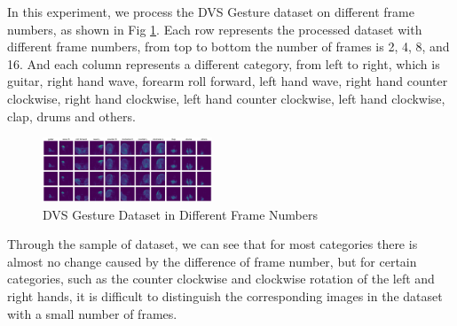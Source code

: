 \documentclass[conference]{IEEEtran}
\begin{document}
In this experiment, we process the DVS Gesture dataset on different frame numbers, as shown in Fig \ref{fig:dvs_gesture_frame_num}. Each row represents the processed dataset with different frame numbers, from top to bottom the number of frames is 2, 4, 8, and 16. And each column represents a different category, from left to right, which is guitar, right hand wave, forearm roll forward, left hand wave, right hand counter clockwise, right hand clockwise, left hand counter clockwise, left hand clockwise, clap, drums and others\cite{zeng_improving_2017}.
\begin{figure}[htbp]
    \centering
    \includegraphics[width=0.45\textwidth]{figure/dataset.png}
    \caption{DVS Gesture Dataset in Different Frame Numbers}
    \label{fig:dvs_gesture_frame_num}
\end{figure}

Through the sample of dataset, we can see that for most categories there is almost no change caused by the difference of frame number, but for certain categories, such as the counter clockwise and clockwise rotation of the left and right hands, it is difficult to distinguish the corresponding images in the dataset with a small number of frames.
\end{document}
